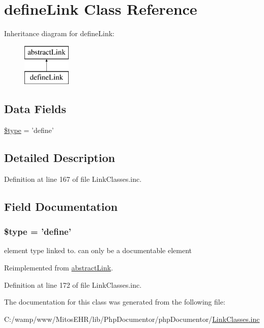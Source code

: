 \hypertarget{classdefine_link}{\section{define\-Link \-Class \-Reference}
\label{classdefine_link}
}
\-Inheritance diagram for define\-Link\-:\begin{figure}[H]
\begin{center}
\leavevmode
\includegraphics[height=2.000000cm]{classdefine_link}
\end{center}
\end{figure}
\subsection*{\-Data \-Fields}
\begin{DoxyCompactItemize}
\item 
\hyperlink{classdefine_link_a9a4a6fba2208984cabb3afacadf33919}{\$type} = 'define'
\end{DoxyCompactItemize}


\subsection{\-Detailed \-Description}


\-Definition at line 167 of file \-Link\-Classes.\-inc.



\subsection{\-Field \-Documentation}
\hypertarget{classdefine_link_a9a4a6fba2208984cabb3afacadf33919}{
\subsubsection[{\$type}]{\setlength{\rightskip}{0pt plus 5cm}\$type = 'define'}}\label{classdefine_link_a9a4a6fba2208984cabb3afacadf33919}
element type linked to. can only be a documentable element 

\-Reimplemented from \hyperlink{classabstract_link_a9a4a6fba2208984cabb3afacadf33919}{abstract\-Link}.



\-Definition at line 172 of file \-Link\-Classes.\-inc.



\-The documentation for this class was generated from the following file\-:\begin{DoxyCompactItemize}
\item 
\-C\-:/wamp/www/\-Mitos\-E\-H\-R/lib/\-Php\-Documentor/php\-Documentor/\hyperlink{_link_classes_8inc}{\-Link\-Classes.\-inc}\end{DoxyCompactItemize}
